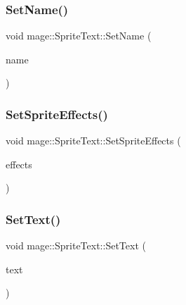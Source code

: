 \hypertarget{classmage_1_1_sprite_text_a48324e6a5f896b11701ad5b0f8ab3ad1}{}\label{classmage_1_1_sprite_text_a48324e6a5f896b11701ad5b0f8ab3ad1} 
\subsubsection{\texorpdfstring{Set\+Name()}{SetName()}}
{\footnotesize\ttfamily void mage\+::\+Sprite\+Text\+::\+Set\+Name (\begin{DoxyParamCaption}\item[{const string \&}]{name }\end{DoxyParamCaption})}

\hypertarget{classmage_1_1_sprite_text_aedce1cc8bca6f038b618044ddfadcf6a}{}\label{classmage_1_1_sprite_text_aedce1cc8bca6f038b618044ddfadcf6a} 
\subsubsection{\texorpdfstring{Set\+Sprite\+Effects()}{SetSpriteEffects()}}
{\footnotesize\ttfamily void mage\+::\+Sprite\+Text\+::\+Set\+Sprite\+Effects (\begin{DoxyParamCaption}\item[{\hyperlink{namespacemage_a9cfe18123066ba4236f548f9de75d881}{Sprite\+Effect}}]{effects }\end{DoxyParamCaption})}

\hypertarget{classmage_1_1_sprite_text_ac33e512ab29554a306ada9a378ab00eb}{}\label{classmage_1_1_sprite_text_ac33e512ab29554a306ada9a378ab00eb} 
\subsubsection{\texorpdfstring{Set\+Text()}{SetText()}\hspace{0.1cm}{\footnotesize\ttfamily [1/2]}}
{\footnotesize\ttfamily void mage\+::\+Sprite\+Text\+::\+Set\+Text (\begin{DoxyParamCaption}\item[{const wstring \&}]{text }\end{DoxyParamCaption})}

